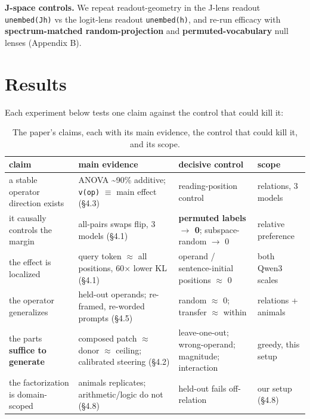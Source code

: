 \textbf{J-space controls.} We repeat readout-geometry in the J-lens
readout \texttt{unembed(J\textperiodcentered{}h)} vs the logit-lens readout
\texttt{unembed(h)}, and re-run efficacy with \textbf{spectrum-matched
random-projection} and \textbf{permuted-vocabulary} null lenses
(Appendix B).

\section{Results}

Each experiment below tests one claim against the control that could
kill it:

{
\begin{table}[t]
\centering\footnotesize
\setlength{\tabcolsep}{4pt}
\begin{tabular}{@{}>{\raggedright\arraybackslash}p{}>{\raggedright\arraybackslash}p{}>{\raggedright\arraybackslash}p{}>{\raggedright\arraybackslash}p{}@{}}
\toprule
claim & main evidence & decisive control & scope \\
\midrule
a stable operator direction exists & ANOVA \textasciitilde90\% additive;
\texttt{v(op)} \ensuremath{\equiv} main effect (\S{}4.3) & reading-position control & 9
relations, 3 models \\
it causally controls the margin & all-pairs swaps flip, 3 models (\S{}4.1)
& \textbf{permuted labels \ensuremath{\to} 0}; subspace-random \ensuremath{\to} 0 & relative
preference \\
the effect is localized & query token \ensuremath{\approx} all positions, 60\ensuremath{\times} lower KL
(\S{}4.1) & operand / sentence-initial positions \ensuremath{\approx} 0 & both Qwen3 scales \\
the operator generalizes & held-out operands; re-framed, re-worded
prompts (\S{}4.5) & random \ensuremath{\approx} 0; transfer \ensuremath{\approx} within & relations + animals \\
the parts \textbf{suffice to generate} & composed patch \ensuremath{\approx} donor \ensuremath{\approx}
ceiling; calibrated steering (\S{}4.2) & leave-one-out; wrong-operand;
magnitude; interaction & greedy, this setup \\
the factorization is domain-scoped & animals replicates;
arithmetic/logic do not (\S{}4.8) & held-out fails off-relation & our setup
(\S{}4.8) \\
\bottomrule
\end{tabular}
\caption{The paper's claims, each with its main evidence, the control that could kill it, and its scope.}
\end{table}
}

